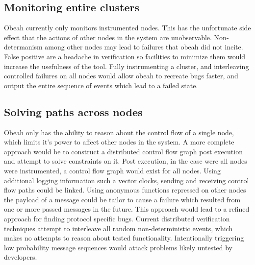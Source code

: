 \subsection{Monitoring entire clusters}

Obeah currently only monitors instrumented nodes. This has the unfortunate side
effect that the actions of other nodes in the system are unobservable.
Non-determanism among other nodes may lead to failures that obeah did not
incite. False positive are a headache in verification so facilities to minimize
them would increase the usefulness of the tool. Fully instrumenting a cluster,
and interleaving controlled failures on all nodes would allow obeah to recreate
bugs faster, and output the entire sequence of events which lead to a failed
state.

\subsection{Solving paths across nodes}

Obeah only has the ability to reason about the control flow of a single node,
which limits it's power to affect other nodes in the system. A more complete
approach would be to construct a distributed control flow graph post execution
and attempt to solve constraints on it. Post execution, in the case were all
nodes were instrumented, a control flow graph would exist for all nodes. Using
additional logging information such a vector clocks, sending and receiving
control flow paths could be linked. Using anonymous functions repressed on other
nodes the payload of a message could be tailor to cause a failure which
resulted from one or more passed messages in the future. This approach would
lead to a refined approach for finding protocol specific bugs. Current
distributed verification techniques attempt to interleave all random
non-deterministic events, which makes no attempts to reason about tested
functionality. Intentionally triggering low probability message sequences would
attack problems likely untested by developers.
